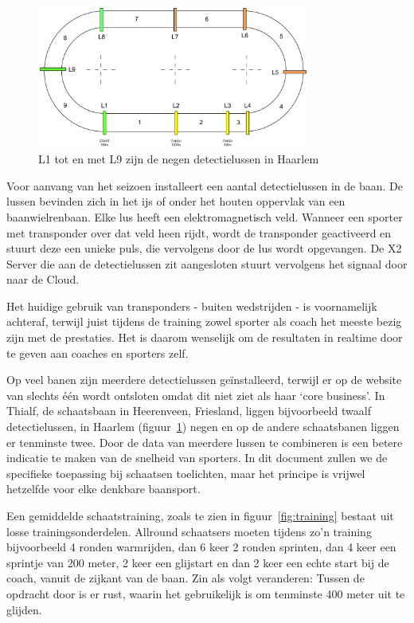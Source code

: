 \begin{figure}
  \begin{center}
    \includegraphics[width=0.8\textwidth]{style/images/BaanoverzichtHaarlem}
  \end{center}
  \caption{L1 tot en met L9 zijn de negen \mylaps detectielussen in Haarlem}
  \label{fig:track-transponders}
\end{figure}

Voor aanvang van het seizoen installeert \mylaps een aantal detectielussen in de baan. De lussen bevinden zich in het ijs of onder het houten oppervlak van een baanwielrenbaan. Elke lus heeft een elektromagnetisch veld. Wanneer een sporter met transponder over dat veld heen rijdt, wordt de transponder geactiveerd en stuurt deze een unieke puls, die vervolgens door de lus wordt opgevangen. De \mylaps X2 Server die aan de detectielussen zit aangesloten stuurt vervolgens het signaal door naar de \mylaps Cloud.

Het huidige gebruik van transponders - buiten wedstrijden - is voornamelijk achteraf, terwijl juist tijdens de training zowel sporter als coach het meeste bezig zijn met de prestaties. Het is daarom wenselijk om de resultaten in realtime door te geven aan coaches en sporters zelf.

Op veel banen zijn meerdere detectielussen geïnstalleerd, terwijl er op de website van \mylaps slechts één wordt ontsloten omdat \mylaps dit niet ziet als haar `core business'. In Thialf, de schaatsbaan in Heerenveen, Friesland, liggen bijvoorbeeld twaalf detectielussen, in Haarlem (figuur~\ref{fig:track-transponders}) negen en op de andere schaatsbanen liggen er tenminste twee. Door de data van meerdere lussen te combineren is een betere indicatie te maken van de snelheid van sporters. In dit document zullen we de specifieke toepassing bij schaatsen toelichten, maar het principe is vrijwel hetzelfde voor elke denkbare baansport.

Een gemiddelde schaatstraining, zoals te zien in figuur~\ref{fig:training} bestaat uit losse trainingsonderdelen. Allround schaatsers moeten tijdens zo'n training bijvoorbeeld 4 ronden warmrijden, dan 6 keer 2 ronden sprinten, dan 4 keer een sprintje van 200 meter, 2 keer een glijstart en dan 2 keer een echte start bij de coach, vanuit de zijkant van de baan. Zin als volgt veranderen: Tussen de opdracht door is er rust, waarin het gebruikelijk is om tenminste 400 meter uit te glijden.

